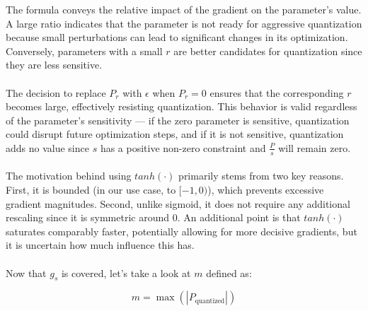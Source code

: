 \noindent The formula conveys the relative impact of the gradient on the parameter's value.
A large ratio indicates that the parameter is not ready for aggressive quantization
because small perturbations can lead to significant changes in its optimization.
Conversely, parameters with a small \(  r  \) are better candidates
for quantization since they are less sensitive.
\\
\\
The decision to replace \( P_r \) with \( \epsilon \) when \( P_r = 0 \)
ensures that the corresponding \( r \) becomes large,
effectively resisting quantization. This behavior is valid regardless of the parameter's sensitivity
 — if the zero parameter is sensitive, quantization could disrupt future optimization steps,
 and if it is not sensitive, quantization adds no value since \( s \) has a positive non-zero constraint 
 and \( \frac{P}{s} \) will remain zero.
\\
\\
The motivation behind using \( tanh(\cdot) \) primarily stems from two key reasons. 
First, it is bounded (in our use case, to \( [-1, 0) \)), which prevents excessive gradient magnitudes.
Second, unlike sigmoid, it does not require any additional rescaling since it is
symmetric around \( 0 \). An additional point is that \( tanh(\cdot) \) saturates comparably faster,
potentially allowing for more decisive gradients,
but it is uncertain how much influence this has.
\\
\\
Now that \( g_s \) is covered, let's take a look at \( m \) defined as:

\[
m = \max\left(\left| P_{\text{quantized}} \right|\right) 
\]

